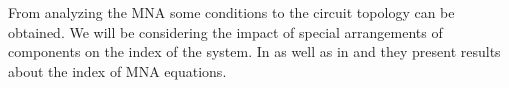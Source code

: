 %
%
%
%
%
%	
%
%


From analyzing the MNA some conditions to the circuit topology can be obtained. We will be considering the impact of special arrangements of components on the index of the system. In \cite{Tischendorf2005Topological} as well as in \cite{shashkov_tuprints27452} and \cite{Reis2014} they present results about the index of MNA equations.



